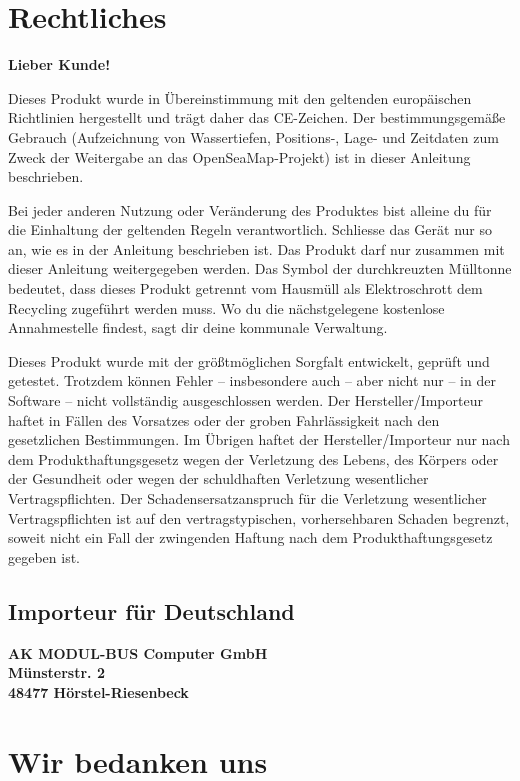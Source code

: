 \documentclass[pdftex, 8pt, paper=130mm:92mm,pagesize]{scrartcl}
\let\stdsection\section
\renewcommand\section{\newpage\stdsection}
\begin{document}
\section{Rechtliches}
\textbf{\large{Lieber Kunde!}}\normalsize

Dieses Produkt wurde in Übereinstimmung mit den geltenden europäischen Richtlinien hergestellt und trägt daher das CE-Zeichen. Der bestimmungsgemäße Gebrauch (Aufzeichnung von Wassertiefen, Positions-, Lage- und Zeitdaten zum Zweck der Weitergabe an das OpenSeaMap-Projekt) ist in dieser Anleitung beschrieben.

Bei jeder anderen Nutzung oder Veränderung des Produktes bist alleine du für die Einhaltung der geltenden Regeln verantwortlich. Schliesse das Gerät nur so an, wie es in der Anleitung beschrieben ist. Das Produkt darf nur zusammen mit dieser Anleitung weitergegeben werden. Das Symbol der durchkreuzten Mülltonne bedeutet, dass dieses Produkt getrennt vom Hausmüll als Elektroschrott dem Recycling zugeführt werden muss. Wo du die nächstgelegene kostenlose Annahmestelle findest, sagt dir deine kommunale Verwaltung.

Dieses Produkt wurde mit der größtmöglichen Sorgfalt entwickelt, geprüft und getestet. Trotzdem können Fehler – insbesondere auch – aber nicht nur – in der Software – nicht vollständig ausgeschlossen werden. Der Hersteller/Importeur haftet in Fällen des Vorsatzes oder der groben Fahrlässigkeit nach den gesetzlichen Bestimmungen. Im Übrigen haftet der Hersteller/Importeur nur nach dem Produkthaftungsgesetz wegen der Verletzung des Lebens, des Körpers oder der Gesundheit oder wegen der schuldhaften Verletzung wesentlicher Vertragspflichten. Der Schadensersatzanspruch für die Verletzung wesentlicher Vertragspflichten ist auf den vertragstypischen, vorhersehbaren Schaden begrenzt, soweit nicht ein Fall der zwingenden Haftung nach dem Produkthaftungsgesetz gegeben ist.



\subsection{Importeur für Deutschland}
\textbf{AK MODUL-BUS Computer GmbH\\
Münsterstr. 2\\
48477 Hörstel-Riesenbeck }

\section{Wir bedanken uns}
\end{document}
